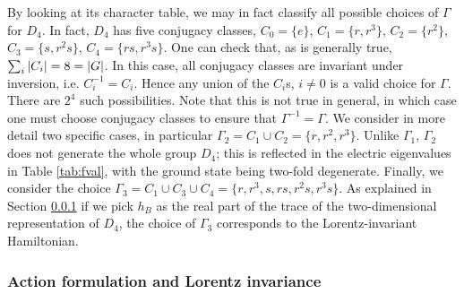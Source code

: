 By looking at its character table, we may in fact classify all possible choices of $\Gamma$ for $D_4$.
In fact, $D_4$ has five conjugacy classes, $C_0 = \{e\}$, $C_1 = \{r, r^3\}$, $C_2 = \{r^2\}$, $C_3 = \{s, r^2s\}$, $C_4 = \{rs, r^3s\}$.
One can check that, as is generally true, $\sum_i \abs{C_i}=8=\abs{G}$.
In this case, all conjugacy classes are invariant under inversion, i.e.
$C_i^{-1}=C_i$.
 Hence any union of the $C_i$s, $i \neq 0$ is a valid choice for $\Gamma$.
There are $2^4$ such possibilities.
Note that this is not true in general, in which case one must choose conjugacy classes to ensure that $\Gamma^{-1}=\Gamma$.
We consider in more detail two specific cases, in particular $\Gamma_2 = C_1 \cup C_2 = \{r, r^2, r^3\}$.
Unlike $\Gamma_1$, $\Gamma_2$ does not generate the whole group $D_4$; this is reflected in the electric eigenvalues in Table \ref{tab:fval}, with the ground state being two-fold degenerate.
Finally, we consider the choice $\Gamma_3=C_1 \cup C_3 \cup C_4=\{r, r^3, s, rs, r^2s, r^3s\}$.
As explained in Section \ref{sec:action formulation} if we pick $h_B$ as the real part of the trace of the two-dimensional representation of $D_4$, the choice of $\Gamma_3$ corresponds to the Lorentz-invariant Hamiltonian.

\subsubsection{Action formulation and Lorentz invariance}\label{sec:action formulation}

